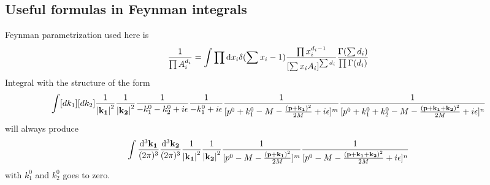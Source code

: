 \documentclass{article}
\begin{document}
\clearpage

\begin{appendices}
	\section{Useful formulas in Feynman integrals}
	Feynman parametrization used here is
	\begin{align}
		\frac{1}{\prod A_i^{d_i}}=\int\prod \dd x_i \delta(\sum x_i-1)\frac{\prod x_i^{d_i-1}}{\bqty{\sum x_iA_i}^{\sum d_i}}\frac{\Gamma(\sum d_i)}{\prod\Gamma(d_i)}
		\label{FEYNMANPARA}
	\end{align}
	Integral with the structure of the form
	\begin{align*}
		\int[dk_1][dk_2]\frac{1}{\vb{\abs{k_1}}^2}\frac{1}{\vb{\abs{k_2}}^2}\frac{1}{-k_1^0-k_2^0+i\epsilon}\frac{1}{-k_1^0+i\epsilon}\frac{1}{[p^0+k_1^0-M-\frac{\vb{(p+k_1)}^2}{2M}+i\epsilon]^m}\frac{1}{[p^0+k_1^0+k_2^0-M-\frac{\vb{(p+k_1+k_2)}^2}{2M}+i\epsilon]^n}
	\end{align*}
	will always produce
	\begin{align*}
		\int\frac{\dd^3\vb{k_1}}{(2\pi)^3}\frac{\dd^3\vb{k_2}}{(2\pi)^3}\frac{1}{\vb{\abs{k_1}}^2}\frac{1}{\vb{\abs{k_2}}^2}\frac{1}{[p^0-M-\frac{\vb{(p+k_1)}^2}{2M}]^m}\frac{1}{[p^0-M-\frac{\vb{(p+k_1+k_2)}^2}{2M}+i\epsilon]^n}
	\end{align*}
	with $k_1^0$ and $k_2^0$ goes to zero.


\end{appendices}
\end{document}
